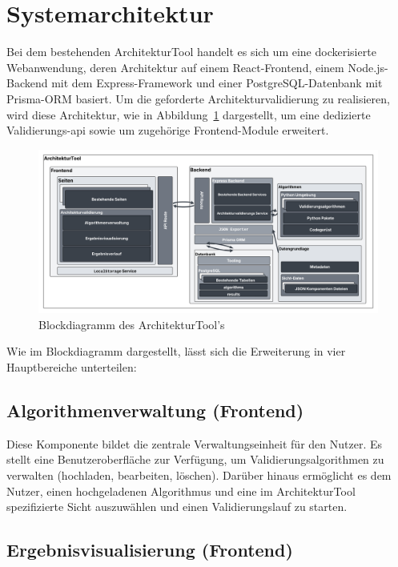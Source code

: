 \section{Systemarchitektur}

Bei dem bestehenden ArchitekturTool handelt es sich um eine dockerisierte Webanwendung, deren Architektur auf einem React-Frontend, einem Node.js-Backend mit dem Express-Framework und einer PostgreSQL-Datenbank mit Prisma-ORM basiert. Um die geforderte Architekturvalidierung zu realisieren, wird diese Architektur, wie in Abbildung~\ref{fig:blockdiagram} dargestellt, um eine dedizierte Validierungs-\gls{api} sowie um zugehörige Frontend-Module erweitert.


\begin{figure}[h!]
  \centering
  \includegraphics[width=\textwidth]{figures/04Konzeption/Blockdiagram.png}
  \caption{Blockdiagramm des ArchitekturTool's}
  \label{fig:blockdiagram}
\end{figure}


Wie im Blockdiagramm dargestellt, lässt sich die Erweiterung in vier Hauptbereiche unterteilen:

\subsection*{Algorithmenverwaltung (Frontend)}

Diese Komponente bildet die zentrale Verwaltungseinheit für den Nutzer. Es stellt eine Benutzeroberfläche zur Verfügung, um Validierungsalgorithmen zu verwalten (hochladen, bearbeiten, löschen). Darüber hinaus ermöglicht es dem Nutzer, einen hochgeladenen Algorithmus und eine im ArchitekturTool spezifizierte Sicht auszuwählen und einen Validierungslauf zu starten.

\subsection*{Ergebnisvisualisierung (Frontend)}

